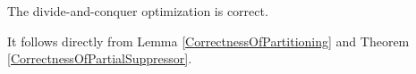 \begin{corollary}
The divide-and-conquer optimization \SplitData is correct.
\end{corollary}
\begin{pf}
It follows directly from Lemma \ref{CorrectnessOfPartitioning} and
Theorem \ref{CorrectnessOfPartialSuppressor}.
\end{pf}


